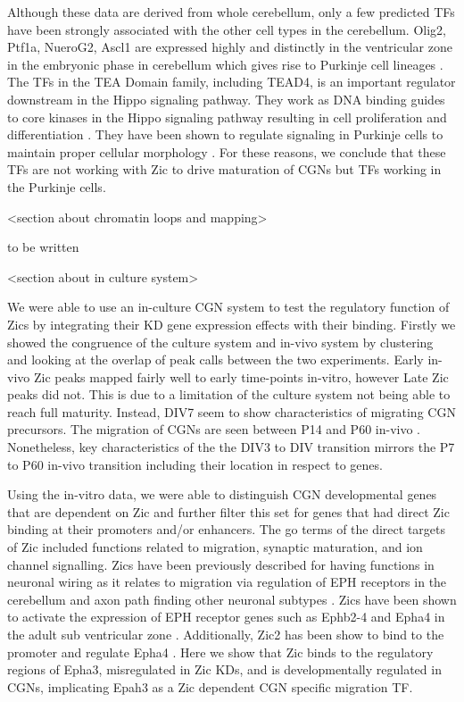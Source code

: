 \documentclass[fleqn,10pt]{wlscirep}
\begin{document}
Although these data are derived from whole cerebellum, only a few predicted TFs have been strongly associated with the other cell types in the cerebellum. Olig2, Ptf1a, NueroG2, Ascl1 are expressed highly and distinctly in the ventricular zone in the embryonic phase in cerebellum which gives rise to Purkinje cell lineages \cite{Lowenstein2021Olig3Development}. The TFs in the TEA Domain family, including TEAD4, is an important regulator downstream in the Hippo signaling pathway. They work as DNA binding guides to core kinases in the Hippo signaling pathway resulting in cell proliferation and differentiation  \cite{Lavado2018TheNumber, Jin2020TheDiseases}. They have been shown to regulate signaling in Purkinje cells to maintain proper cellular morphology \cite{Jin2020TheDiseases}. For these reasons, we conclude that these TFs are not working with Zic to drive maturation of CGNs but TFs working in the Purkinje cells.

<section about chromatin loops and mapping>

to be written

<section about in culture system>

We were able to use an in-culture CGN system to test the regulatory function of Zics by integrating their KD gene expression effects with their binding. Firstly we showed the congruence of the culture system and in-vivo system by clustering and looking at the overlap of peak calls between the two experiments. Early in-vivo Zic peaks mapped fairly well to early time-points in-vitro, however Late Zic peaks did not. This is due to a limitation of the culture system not being able to reach full maturity. Instead, DIV7 seem to show characteristics of migrating CGN precursors. The migration of CGNs are seen between P14 and P60 in-vivo \cite{}. Nonetheless, key characteristics of the the DIV3 to DIV transition mirrors the P7 to P60 in-vivo transition including their location in respect to genes. 

Using the in-vitro data, we were able to distinguish CGN developmental genes that are dependent on Zic and further filter this set for genes that had direct Zic binding at their promoters and/or enhancers. The go terms of the direct targets of Zic included functions related to migration, synaptic maturation, and ion channel signalling. Zics have been previously described for having functions in neuronal wiring as it relates to migration via regulation of EPH receptors in the cerebellum and axon path finding other neuronal subtypes  \cite{Aruga2018ZicDisease}. Zics have been shown to activate the expression of EPH receptor genes such as Ephb2-4 and Epha4 in the adult sub ventricular zone \cite{Conover2000DisruptionZone}. Additionally, Zic2 has been show to bind to the promoter and regulate Epha4 \cite{Luo2015Zic2Specification, Escalante2013Zic2-DependentCNS}. Here we show that Zic binds to the regulatory regions of Epha3, misregulated in Zic KDs, and is developmentally regulated in CGNs, implicating Epah3 as a Zic dependent CGN specific migration TF.
\end{document}
